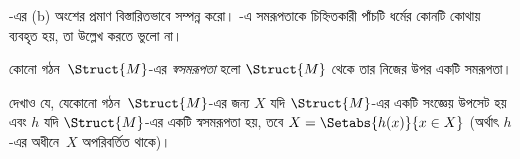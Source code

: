 \documentclass[../../../include/open-logic-section]{subfiles}
\begin{document}
\begin{prob}
-এর (b) অংশের প্রমাণ বিস্তারিতভাবে
সম্পন্ন করো। -এ সমরূপতাকে
চিহ্নিতকারী পাঁচটি ধর্মের কোনটি কোথায় ব্যবহৃত হয়, তা উল্লেখ করতে ভুলো না।
\end{prob}

\begin{defn}
কোনো গঠন~$\Struct{M}$-এর \emph{স্বসমরূপতা} হলো $\Struct{M}$ থেকে তার
নিজের উপর একটি সমরূপতা।
\end{defn}

\begin{prob}
দেখাও যে, যেকোনো গঠন~$\Struct{M}$-এর জন্য $X$ যদি $\Struct{M}$-এর
একটি সংজ্ঞেয় উপসেট হয় এবং $h$ যদি $\Struct{M}$-এর একটি স্বসমরূপতা
হয়, তবে $X = \Setabs{h(x)}{x \in X}$ (অর্থাৎ $h$-এর অধীনে~$X$
অপরিবর্তিত থাকে)।
\end{prob}
\end{document}
